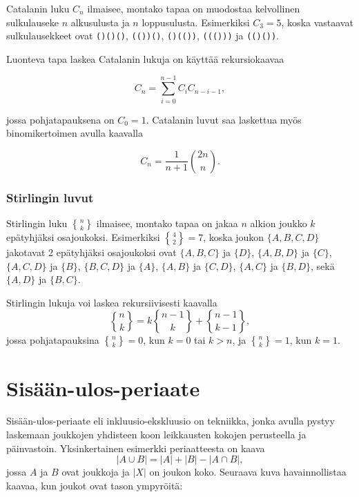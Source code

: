 Catalanin luku $C_n$ ilmaisee,
montako tapaa on muodostaa kelvollinen sulkulauseke
$n$ alkusulusta ja $n$ loppusulusta.
Esimerkiksi $C_3=5$, koska vastaavat sulkulausekkeet
ovat \texttt{()()()}, \texttt{(())()},
\texttt{()(())}, \texttt{((()))} ja \texttt{(()())}.

Luonteva tapa laskea Catalanin lukuja
on käyttää rekursiokaavaa

\[ C_n = \sum_{i=0}^{n-1} C_i C_{n-i-1}, \]

jossa pohjatapauksena on $C_0=1$.
Catalanin luvut saa laskettua myös binomikertoimen avulla kaavalla

\[ C_n = \frac{1}{n+1} {2n \choose n}. \]

\subsubsection*{Stirlingin luvut}

Stirlingin luku ${n \brace k}$ ilmaisee,
montako tapaa on jakaa $n$ alkion joukko
$k$ epätyhjäksi osajoukoksi.
Esimerkiksi ${4 \brace 2}=7$, koska
joukon $\{A,B,C,D\}$ jakotavat 2
epätyhjäksi osajoukoksi ovat
 $\{A,B,C\}$ ja $\{D\}$, 
 $\{A,B,D\}$ ja $\{C\}$,
 $\{A,C,D\}$ ja $\{B\}$,
 $\{B,C,D\}$ ja $\{A\}$,
  $\{A,B\}$ ja $\{C,D\}$,
  $\{A,C\}$ ja $\{B,D\}$, sekä
  $\{A,D\}$ ja $\{B,C\}$.

\noindent
Stirlingin lukuja voi laskea rekursiivisesti kaavalla
\[ {n \brace k} = k{n-1 \brace k} + {n-1 \brace k-1}, \]
jossa pohjatapauksina ${n \brace k}=0$,
kun $k=0$ tai $k>n$, ja ${n \brace k}=1$, kun $k=1$.

\section{Sisään-ulos-periaate}

Sisään-ulos-periaate eli inkluusio-ekskluusio
on tekniikka, jonka avulla pystyy laskemaan
joukkojen yhdisteen koon leikkausten
kokojen perusteella ja päinvastoin.
Yksinkertainen esimerkki periaatteesta on kaava
\[ |A \cup B| = |A| + |B| - |A \cap B|,\]
jossa $A$ ja $B$ ovat joukkoja ja $|X|$ on joukon koko.
Seuraava kuva havainnollistaa kaavaa,
kun joukot ovat tason ympyröitä:

\begin{center}
\end{center}

